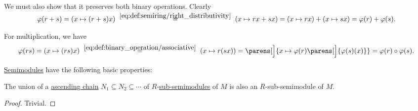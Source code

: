 \begin{defproof}
  We must also show that it preserves both binary operations. Clearly
  \begin{equation*}
    \varphi(r + s)
    =
    (x \mapsto (r + s) x)
    \reloset {\eqref{eq:def:semiring/right_distributivity}} =
    (x \mapsto r x + s x)
    =
    (x \mapsto r x) + (x \mapsto s x)
    =
    \varphi(r) + \varphi(s).
  \end{equation*}

  For multiplication, we have
  \begin{equation*}
    \varphi(rs)
    =
    (x \mapsto (rs)x)
    \reloset {\eqref{eq:def:binary_operation/associative}} =
    (x \mapsto r(sx))
    =
    \parens[\Big]{ x \mapsto \varphi(r)\parens[\Big]{ \varphi(s)(x) } }
    =
    \varphi(r) \bincirc \varphi(s).
  \end{equation*}
\end{defproof}

\begin{proposition}\label{thm:def:semimodule}
  \hyperref[def:semimodule]{Semimodules} have the following basic properties:
  \begin{thmenum}
     The union of a \hyperref[def:stabilizing_chain]{ascending chain} \( N_1 \subseteq N_2 \subseteq \cdots \) of \( R \)-\hyperref[def:semimodule/submodel]{sub-semimodules} of \( M \) is also an \( R \)-sub-semimodule of \( M \).
  \end{thmenum}
\end{proposition}
\begin{proof}
   Trivial.
\end{proof}

